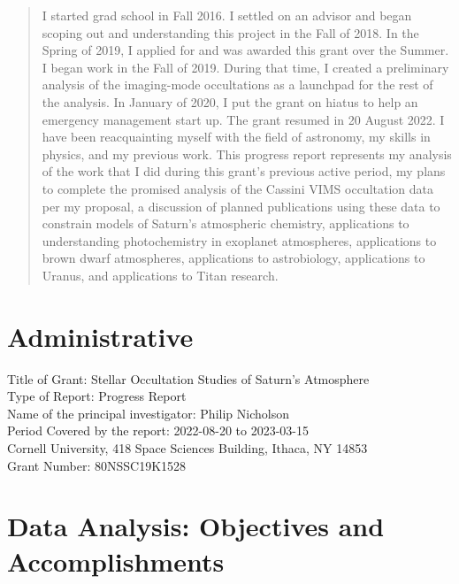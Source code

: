 \documentclass[12pt]{article}
\begin{document}
\maketitle

\begin{abstract}

I started grad school in Fall 2016.  I settled on an advisor and began scoping
out and understanding this project in the Fall of 2018.  In the Spring of 2019,
I applied for and was awarded this grant over the Summer. I began work in the
Fall of 2019.  During that time, I created a preliminary analysis of the
imaging-mode occultations as a launchpad for the rest of the analysis.  In
January of 2020, I put the grant on hiatus to help an emergency management
start up.  The grant resumed in 20 August 2022. I have been reacquainting myself
with the field of astronomy, my skills in physics, and my previous work.  This
progress report represents my analysis of the work that I did during this
grant's previous active period, my plans to complete the promised analysis of
the Cassini VIMS occultation data per my proposal, a discussion of planned
publications using these data to constrain models of Saturn's atmospheric
chemistry, applications to understanding photochemistry in exoplanet
atmospheres, applications to brown dwarf atmospheres, applications to
astrobiology, applications to Uranus, and applications to Titan research.

\end{abstract}

\section{Administrative}

Title of Grant: Stellar Occultation Studies of Saturn’s Atmosphere\\
Type of Report: Progress Report\\
Name of the principal investigator: Philip Nicholson\\
Period Covered by the report: 2022-08-20 to 2023-03-15 \\
Cornell University, 418 Space Sciences Building, Ithaca, NY 14853\\
Grant Number: 80NSSC19K1528\\

\section{Data Analysis: Objectives and Accomplishments}
\end{document}
